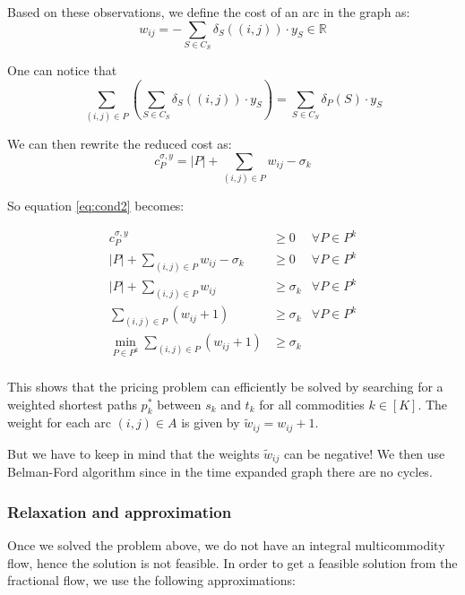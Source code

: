 \documentclass[14pt,a4paper]{article}
\theoremstyle{definition}
\numberwithin{equation}{subsection}
\begin{document}
Based on these observations, we define the cost of an arc in the graph as:
\begin{equation*}
w_{ij} = -\sum_{S \in C_S} \delta_S((i,j))\cdot y_S \in \mathbb{R}
\end{equation*}

One can notice that 
$$ \sum_{(i,j)\in P}\left(\sum_{S \in C_S} \delta_S((i,j))\cdot y_S \right)=   \sum\limits_{S \in C_S}   \delta_P(S)\cdot y_S$$

We can then rewrite the reduced cost as: 
$$ c_P^{\sigma,y} = |P| + \sum\limits_{(i,j) \in P}  w_{ij} -\sigma_k $$

So equation \eqref{eq:cond2} becomes:

\begin{eqnarray*}
		c_P^{\sigma,y} & \geq 0 &\forall P \in P^k\\
		|P| + \sum\limits_{(i,j) \in P}  w_{ij} -\sigma_k & \geq 0 &\forall P \in P^k\\
		|P| + \sum\limits_{(i,j) \in P}  w_{ij}  & \geq \sigma_k &\forall P \in P^k\\
		\sum\limits_{(i,j) \in P} \left( w_{ij} + 1\right)  & \geq \sigma_k &\forall P \in P^k\\
		\min_{P\in P^k}\sum\limits_{(i,j) \in P} \left( w_{ij} + 1\right)  & \geq \sigma_k & \\
\end{eqnarray*}


This shows that the pricing problem can efficiently be solved by searching for a weighted shortest paths $p^*_k$ between $s_k$ and $t_k$ for all commodities $k \in [K]$. The weight for each arc $(i,j)\in A$ is given by $\tilde{w}_{ij} = w_{ij}+1$.


But we have to keep in mind that the weights $\tilde{w}_{ij}$ can be negative! We then use Belman-Ford algorithm since in the time expanded graph there are no cycles.


\subsubsection{Relaxation and approximation}

Once we solved the problem above, we do not have an integral multicommodity flow, hence the solution is not feasible. In order to get a feasible solution from the fractional flow, we use the   following approximations:
\end{document}
